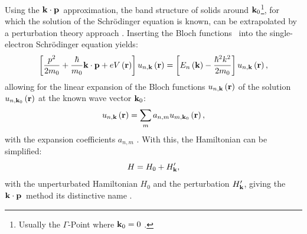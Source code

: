 Using the $\vb{k}\cdot\vb{p}$~approximation, the band structure of solids around $\vb{k}_0$\footnote{Usually the $\Gamma$-Point where $\vb{k}_0 = 0$ \cite{Kittel1987,Piprek2003,Yu2010}.}, for which the solution of the Schrödinger equation is known, can be extrapolated by a perturbation theory approach \cite{Kittel1987,Piprek2003,Yu2010}. Inserting the Bloch functions~ into the single-electron Schrödinger equation yields:
\begin{equation}
  \left[ \frac{p^2}{2m_0} + \frac{\hbar}{m_0}\vb{k}\cdot\vb{p} + eV\left(\vb{r}\right)\right]u_{n,\vb{k}}\left(\vb{r}\right) = \left[E_n\left(\vb{k}\right) - \frac{\hbar^2k^2}{2m_0}\right]u_{n,\vb{k}}\left(\vb{r}\right),
\end{equation}
allowing for the linear expansion of the Bloch functions $u_{n,\vb{k}}\left(\vb{r}\right)$ of the solution $u_{n,\vb{k}_0}\left(\vb{r}\right)$ at the known wave vector $\vb{k}_0$:
\begin{equation}
  u_{n,\vb{k}}\left(\vb{r}\right) = \sum_m a_{n,m} u_{m,\vb{k}_0}\left(\vb{r}\right),
\end{equation}
with the expansion coefficients $a_{n,m}$ \cite{Kittel1987,Piprek2003,Yu2010}. With this, the Hamiltonian can be simplified:
\begin{equation}
  H = H_0 + H_{\vb{k}}',
\end{equation}
with the unperturbated Hamiltonian $H_0$ and the perturbation $H_{\vb{k}}'$, giving the $\vb{k}\cdot\vb{p}$~method its distinctive name \cite{Kittel1987,Piprek2003,Yu2010}.

